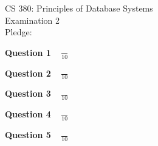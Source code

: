 \documentclass[12pt]{article}
\begin{document}
\pagestyle{empty}

\vspace*{3in}

\begin{center}

CS 380: Principles of Database Systems \\
Examination 2 \\
Pledge: \\

\end{center}

\newpage

{\bf Question 1} {\Large $\;\;\;\frac{}{10}$ }

\newpage

{\bf Question 2} {\Large $\;\;\; \frac{}{10}$ }

\newpage

{\bf Question 3} {\Large $\;\;\; \frac{}{10}$ }

\newpage

{\bf Question 4} {\Large $\;\;\; \frac{}{10}$ }

\newpage

{\bf Question 5} {\Large $\;\;\; \frac{}{10}$ }
\end{document}
